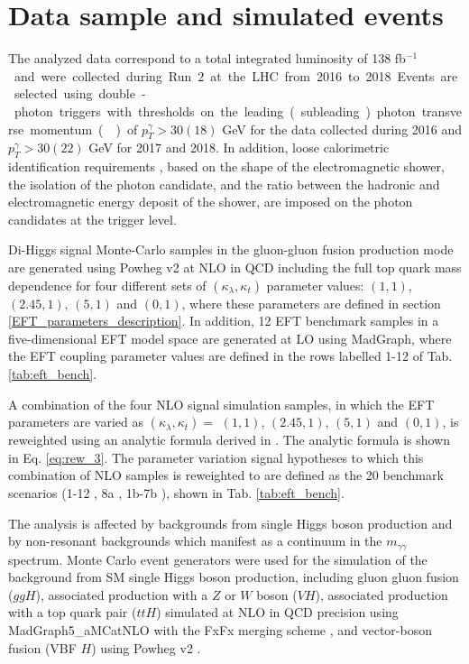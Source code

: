\section{Data sample and simulated events} \label{sec:samples}

The analyzed data correspond to a total integrated luminosity of 138 \unit{fb$^{-1}$} and were collected during Run 2 at the LHC from 2016 to 2018.
Events are selected using double-photon triggers with thresholds on the
leading (subleading) photon transverse momentum (\pt) of $p_T^{\gamma} > 30 (18)$ GeV
for the data collected during 2016
and $p_T^{\gamma} > 30 (22)$ GeV for 2017 and 2018.
In addition, loose calorimetric identification requirements \cite{Sirunyan:2018ouh}, based
on the shape of the electromagnetic shower, the isolation of the photon candidate, and the ratio
between the hadronic and electromagnetic energy deposit of the shower, are imposed on the
photon candidates at the trigger level.

Di-Higgs signal Monte-Carlo samples in the gluon-gluon fusion production mode are generated using Powheg v2 \cite{Nason:2004rx, Frixione:2007vw, Alioli:2010xd, Heinrich:2019bkc}
at NLO in QCD including the full top quark mass dependence
for four different sets of $(\kappa_{\lambda}, \kappa_{t})$ parameter values: $(1, 1)$, $(2.45, 1)$, $(5, 1)$ and $(0, 1)$, where these parameters are defined in section \ref{EFT_parameters_description}. 
In addition, 12 EFT benchmark samples in a five-dimensional EFT model space are generated at LO \cite{Carvalho:2015ttv} using MadGraph, where the EFT coupling parameter values are defined in the rows labelled 
1-12 of Tab. \ref{tab:eft_bench}.   

A combination of the four NLO signal simulation samples, in which the EFT parameters are varied as $(\kappa_{\lambda}, \kappa_{t}) = $ $(1, 1)$, $(2.45, 1)$, $(5, 1)$ and $(0, 1)$, is reweighted using an analytic formula derived in \cite{Carvalho:2016rys,Buchalla:2018yce}. The analytic formula is shown in Eq. \ref{eq:rew_3}. 
The parameter variation signal hypotheses to which this combination of NLO samples is reweighted to are defined as the 20 benchmark scenarios (1-12 \cite{Carvalho:2015ttv}, 8a \cite{Buchalla:2018yce}, 1b-7b \cite{Capozi:2019xsi}), shown in Tab. \ref{tab:eft_bench}. 

The analysis is affected by backgrounds from single Higgs boson production and by non-resonant backgrounds which manifest as a continuum in the $m_{\gamma\gamma}$ spectrum.
Monte Carlo event generators were used for the simulation of the background from SM single Higgs boson production, including
gluon gluon fusion ($ggH$), associated production with a $Z$ or $W$ boson ($VH$), associated production with a top quark pair ($ttH$)
simulated at NLO in QCD precision using MadGraph5\_aMCatNLO \cite{Alwall:2014hca, Artoisenet:2012st} with the FxFx merging scheme \cite{Frederix:2012ps},
and vector-boson fusion (VBF $H$) using Powheg v2 \cite{Nason:2004rx, Frixione:2007vw}.

